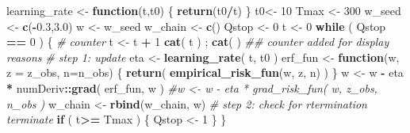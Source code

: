 \documentclass[
]{article}
\newenvironment{Shaded}{\begin{snugshade}}{\end{snugshade}}
\newcommand{\CommentTok}[1]{\textcolor[rgb]{0.56,0.35,0.01}{\textit{#1}}}
\newcommand{\ControlFlowTok}[1]{\textcolor[rgb]{0.13,0.29,0.53}{\textbf{#1}}}
\newcommand{\DataTypeTok}[1]{\textcolor[rgb]{0.13,0.29,0.53}{#1}}
\newcommand{\DecValTok}[1]{\textcolor[rgb]{0.00,0.00,0.81}{#1}}
\newcommand{\FloatTok}[1]{\textcolor[rgb]{0.00,0.00,0.81}{#1}}
\newcommand{\KeywordTok}[1]{\textcolor[rgb]{0.13,0.29,0.53}{\textbf{#1}}}
\newcommand{\NormalTok}[1]{#1}
\newcommand{\OperatorTok}[1]{\textcolor[rgb]{0.81,0.36,0.00}{\textbf{#1}}}
\newcommand{\StringTok}[1]{\textcolor[rgb]{0.31,0.60,0.02}{#1}}
\begin{document}
\begin{Shaded}
\begin{Highlighting}[]
\NormalTok{learning\_rate \textless{}{-}}\StringTok{ }\ControlFlowTok{function}\NormalTok{(t,t0) \{}
  \KeywordTok{return}\NormalTok{(t0}\OperatorTok{/}\NormalTok{t)}
\NormalTok{\}}
\NormalTok{t0\textless{}{-}}\StringTok{ }\DecValTok{10}
\NormalTok{Tmax \textless{}{-}}\StringTok{ }\DecValTok{300}
\NormalTok{w\_seed \textless{}{-}}\StringTok{ }\KeywordTok{c}\NormalTok{(}\OperatorTok{{-}}\FloatTok{0.3}\NormalTok{,}\FloatTok{3.0}\NormalTok{)}
\NormalTok{w \textless{}{-}}\StringTok{ }\NormalTok{w\_seed}
\NormalTok{w\_chain \textless{}{-}}\StringTok{ }\KeywordTok{c}\NormalTok{()}
\NormalTok{Qstop \textless{}{-}}\StringTok{ }\DecValTok{0} 
\NormalTok{t \textless{}{-}}\StringTok{ }\DecValTok{0}
\ControlFlowTok{while}\NormalTok{ ( Qstop }\OperatorTok{==}\StringTok{ }\DecValTok{0}\NormalTok{ ) \{}
  \CommentTok{\# counter}
\NormalTok{  t \textless{}{-}}\StringTok{ }\NormalTok{t }\OperatorTok{+}\StringTok{  }\DecValTok{1}
  \KeywordTok{cat}\NormalTok{( t ) ; }\KeywordTok{cat}\NormalTok{( }\StringTok{\textquotesingle{} \textquotesingle{}}\NormalTok{ ) }\CommentTok{\#\# counter added for display reasons}
  \CommentTok{\# step 1: update  }
\NormalTok{  eta \textless{}{-}}\StringTok{ }\KeywordTok{learning\_rate}\NormalTok{( t, t0 )}
\NormalTok{  erf\_fun \textless{}{-}}\StringTok{ }\ControlFlowTok{function}\NormalTok{(w, }\DataTypeTok{z =}\NormalTok{ z\_obs, }\DataTypeTok{n=}\NormalTok{n\_obs) \{}
    \KeywordTok{return}\NormalTok{( }\KeywordTok{empirical\_risk\_fun}\NormalTok{(w, z, n) ) }
\NormalTok{  \}}
\NormalTok{  w \textless{}{-}}\StringTok{ }\NormalTok{w }\OperatorTok{{-}}\StringTok{ }\NormalTok{eta }\OperatorTok{*}\StringTok{ }\NormalTok{numDeriv}\OperatorTok{::}\KeywordTok{grad}\NormalTok{( erf\_fun, w )}
  \CommentTok{\#w \textless{}{-} w {-} eta * grad\_risk\_fun( w, z\_obs, n\_obs )}
\NormalTok{  w\_chain \textless{}{-}}\StringTok{ }\KeywordTok{rbind}\NormalTok{(w\_chain, w)}
  \CommentTok{\# step 2: check for rtermination terminate}
  \ControlFlowTok{if}\NormalTok{ ( t}\OperatorTok{\textgreater{}=}\StringTok{ }\NormalTok{Tmax ) \{}
\NormalTok{    Qstop \textless{}{-}}\StringTok{ }\DecValTok{1}
\NormalTok{  \}}
\NormalTok{\}}
\end{Highlighting}
\end{Shaded}
\end{document}
